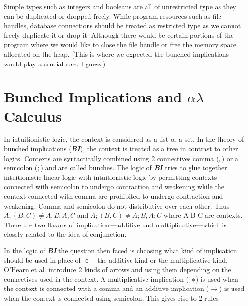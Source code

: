 Simple types such as integers and booleans are all of unrestricted type as
they can be duplicated or dropped freely.
While program resources such as file handles, database connections
should be treated as restricted type as we cannot freely duplicate it
or drop it. Although there would be certain portions of the program where we would
like to close the file handle or free the memory space allocated on the heap.
(This is where we expected the bunched implications would play a crucial role. I guess.)

\section{Bunched Implications and $\alpha\lambda$ Calculus}

In intuitionistic logic, the context is considered as a list or a set. In the theory of
bunched implications (\textbf{\em BI}), the context is treated as a tree in contrast to other logics. Contexts are syntactically
combined using 2 connectives comma ($,$) or a semicolon ($;$) and are called bunches. The logic of \textbf{\em BI}
tries to glue together intuitionistic linear logic with intuitionistic logic by
permitting contexts connected with semicolon to undergo contraction and weakening while the context connected with comma
are prohibited to undergo contraction and weakening. Comma and semicolon do not distributive over each other.
Thus $A,(B;C) \neq A, B ; A,C$ and $A;(B,C) \neq A;B,A;C$ where A B C are contexts.
There are two flavors of implication---additive and multiplicative---which is closely related to the idea of conjunction.
\begin{framed}
\begin{minipage}{1.0\linewidth}
  \begin{prooftree}
  \end{prooftree}
\end{minipage}
\end{framed}
In the logic of {\textbf{\em BI}} the question then faced is choosing what kind of
implication should be used in place of $\lozenge$---the additive kind or the multiplicative kind.
O'Hearn et al. \citeyearpar{ohearn_logic_1999} introduce 2 kinds of arrows
and using them depending on the connectives used in the context. A multiplicative implication ($\sepimp$)
is used when the context is connected with a comma and an additive implication ($\rightarrow$) is used when the
context is connected using semicolon. This gives rise to 2 rules
